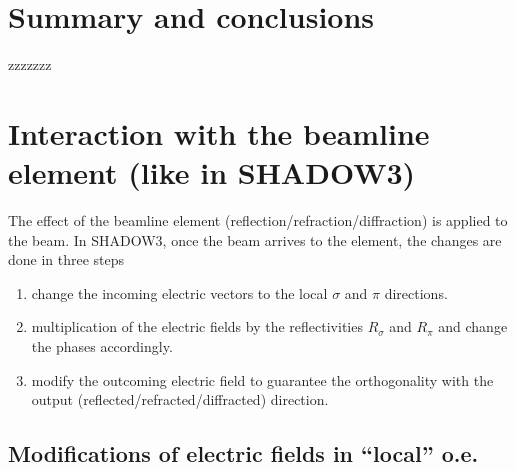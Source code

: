 \documentclass{iucr}
\begin{document}
\section{Summary and conclusions}
\label{sec:summary}

zzzzzzz



\appendix

\section{Interaction with the beamline element (like in SHADOW3)}
\label{sec:S3}

The effect of the beamline element (reflection/refraction/diffraction) is applied to the beam. In SHADOW3, once the beam arrives to the element, the changes are done in three steps 
\begin{enumerate}
    \item change the incoming electric vectors to the local $\sigma$ and $\pi$ directions.
    \item multiplication of the electric fields by the reflectivities $R_\sigma$ and $R_\pi$ and change the phases accordingly.
    \item modify the outcoming electric field to guarantee the orthogonality with the output (reflected/refracted/diffracted) direction.
\end{enumerate}

\subsection{Modifications of electric fields in ``local'' o.e.}
\label{sec:localoe}
\end{document}

